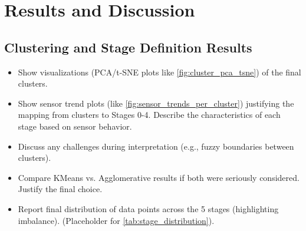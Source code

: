\section{Results and Discussion}
\label{sec:results}


\subsection{Clustering and Stage Definition Results}
\begin{itemize}
	\item Show visualizations (PCA/t-SNE plots like \cref{fig:cluster_pca_tsne}) of the final clusters.
	\item Show sensor trend plots (like \cref{fig:sensor_trends_per_cluster}) justifying the mapping from clusters to Stages 0-4. Describe the characteristics of each stage based on sensor behavior.
	\item Discuss any challenges during interpretation (e.g., fuzzy boundaries between clusters).
	\item Compare KMeans vs. Agglomerative results if both were seriously considered. Justify the final choice.
	\item Report final distribution of data points across the 5 stages (highlighting imbalance). (Placeholder for \cref{tab:stage_distribution}).
\end{itemize}


